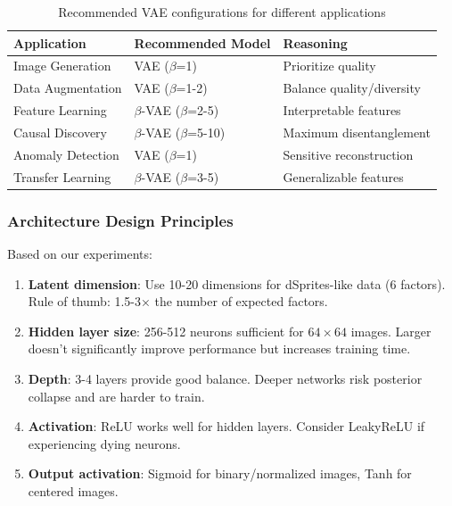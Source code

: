 \documentclass[conference]{IEEEtran}
\begin{document}
\begin{table}[H]
\centering
\begin{tabular}{@{}p{4cm}p{5cm}p{4cm}@{}}
\toprule
\textbf{Application} & \textbf{Recommended Model} & \textbf{Reasoning} \\ \midrule
Image Generation & VAE ($\beta$=1) & Prioritize quality \\
Data Augmentation & VAE ($\beta$=1-2) & Balance quality/diversity \\
Feature Learning & $\beta$-VAE ($\beta$=2-5) & Interpretable features \\
Causal Discovery & $\beta$-VAE ($\beta$=5-10) & Maximum disentanglement \\
Anomaly Detection & VAE ($\beta$=1) & Sensitive reconstruction \\
Transfer Learning & $\beta$-VAE ($\beta$=3-5) & Generalizable features \\ \bottomrule
\end{tabular}
\caption{Recommended VAE configurations for different applications}
\label{tab:applications}
\end{table}

\subsubsection{Architecture Design Principles}

Based on our experiments:
\begin{enumerate}
    \item \textbf{Latent dimension}: Use 10-20 dimensions for dSprites-like data (6 factors). Rule of thumb: 1.5-3× the number of expected factors.
    
    \item \textbf{Hidden layer size}: 256-512 neurons sufficient for $64 \times 64$ images. Larger doesn't significantly improve performance but increases training time.
    
    \item \textbf{Depth}: 3-4 layers provide good balance. Deeper networks risk posterior collapse and are harder to train.
    
    \item \textbf{Activation}: ReLU works well for hidden layers. Consider LeakyReLU if experiencing dying neurons.
    
    \item \textbf{Output activation}: Sigmoid for binary/normalized images, Tanh for centered images.
\end{enumerate}
\end{document}
